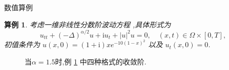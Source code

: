 \documentclass[aspectratio=169]{beamer}
\newtheorem{myexample}{算例}[section] %
\numberwithin{theorem}{section} %
\numberwithin{equation}{section}%
\numberwithin{figure}{section}%
\numberwithin{table}{section}%
\begin{document}
\begin{frame}{数值算例}
	\begin{myexample}\label{exp_PAVF:2}
		考虑一维非线性分数阶波动方程 ,具体形式为
		\begin{equation}\label{eq_PAVF:108}
		u_{t t}+(-\Delta)^{\alpha / 2} u+\mathrm{i}u_t+|u|^2 u=0, \quad (x,t)\in  \Omega\times[0, T],
		\end{equation}
		初值条件为 $u(x, 0)=(1+\mathrm{i}) x e^{-10(1-x)^2}$ 以及 $u_t(x, 0)=0$.
	\end{myexample}
\end{frame}

\begin{frame}%

	\begin{figure}[H]
		\begin{center}
		\caption{当$\alpha=1.5$时,例 \ref{exp_PAVF:2} 中四种格式的收敛阶.}
		 \label{fig_PAVF:1}
		\end{center}
		\end{figure}
\end{frame}
\end{document}

